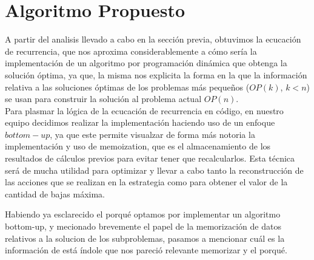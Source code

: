\section{Algoritmo Propuesto}

A partir del analisis llevado a cabo en la sección previa, obtuvimos la ecucación de recurrencia, que nos aproxima considerablemente a cómo sería la implementación de un algoritmo por programación dinámica que obtenga la solución óptima, ya que, la misma nos explicita la forma en la que la información relativa a las soluciones óptimas de los problemas más pequeños ($OP(k)$, $k<n$) se usan para construir la solución al problema actual $OP(n)$.\\

Para plasmar la lógica de la ecucación de recurrencia en código, en nuestro equipo decidimos realizar la implementación haciendo uso de un enfoque $bottom-up$, ya que este permite visualzar de forma más notoria la implementación y uso de memoization, que es el almacenamiento de los resultados de cálculos previos para evitar tener que recalcularlos. Esta técnica será de mucha utilidad para optimizar y llevar a cabo tanto la reconstrucción de las acciones que se realizan en la estrategia como para obtener el valor de la cantidad de bajas máxima.

Habiendo ya esclarecido el porqué optamos por implementar un algoritmo bottom-up, y mecionado brevemente el papel de la memorización de datos relativos a la solucion de los subproblemas, pasamos a mencionar cuál es la información de está índole que nos pareció relevante memorizar y el porqué.\\

